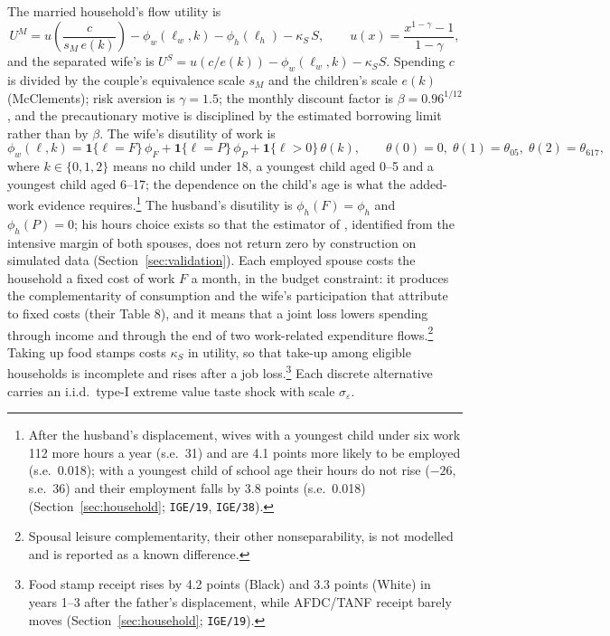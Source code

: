The married household's flow utility is
\begin{equation}\label{eq:uM}
  U^M = u\!\left(\frac{c}{s_M\, e(k)}\right) - \phi_w(\ell_w, k) - \phi_h(\ell_h) - \kappa_S\, S,
  \qquad u(x) = \frac{x^{1-\gamma} - 1}{1-\gamma},
\end{equation}
and the separated wife's is $U^S = u(c/e(k)) - \phi_w(\ell_w, k) - \kappa_S S$. Spending $c$ is divided by the
couple's equivalence scale $s_M$ and the children's scale $e(k)$ (McClements); risk aversion is $\gamma = 1.5$; the
monthly discount factor is $\beta = 0.96^{1/12}$, and the precautionary motive is disciplined by the estimated borrowing
limit rather than by $\beta$. The wife's disutility of work is
\[
  \phi_w(\ell, k) = \mathbf{1}\{\ell = F\}\,\phi_F + \mathbf{1}\{\ell = P\}\,\phi_P + \mathbf{1}\{\ell > 0\}\,\theta(k),
  \qquad \theta(0) = 0,\; \theta(1) = \theta_{05},\; \theta(2) = \theta_{617},
\]
where $k \in \{0, 1, 2\}$ means no child under 18, a youngest child aged 0--5 and a youngest child aged 6--17; the
dependence on the child's age is what the added-work evidence requires.\footnote{After the husband's displacement,
wives with a youngest child under six work 112 more hours a year (s.e.\ 31) and are 4.1 points more likely to be
employed (s.e.\ 0.018); with a youngest child of school age their hours do not rise ($-26$, s.e.\ 36) and their
employment falls by 3.8 points (s.e.\ 0.018) (Section~\ref{sec:household}; \texttt{IGE/19}, \texttt{IGE/38}).} The
husband's disutility is $\phi_h(F) = \phi_h$ and $\phi_h(P) = 0$; his hours choice exists so that the estimator of
\citet{blundell2016consumption}, identified from the intensive margin of both spouses, does not return zero by
construction on simulated data (Section~\ref{sec:validation}). Each employed spouse costs the household a fixed cost
of work $F$ a month, in the budget constraint: it produces the complementarity of consumption and the wife's
participation that \citet{blundell2016consumption} attribute to fixed costs (their Table 8), and it means that a joint
loss lowers spending through income and through the end of two work-related expenditure flows.\footnote{Spousal
leisure complementarity, their other nonseparability, is not modelled and is reported as a known difference.} Taking
up food stamps costs $\kappa_S$ in utility, so that take-up among eligible households is incomplete and rises after a
job loss.\footnote{Food stamp receipt rises by 4.2 points (Black) and 3.3 points (White) in years 1--3 after the
father's displacement, while AFDC/TANF receipt barely moves (Section~\ref{sec:household}; \texttt{IGE/19}).} Each
discrete alternative carries an i.i.d.\ type-I extreme value taste shock with scale $\sigma_\varepsilon$.

